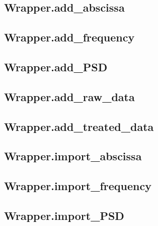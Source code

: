 \subsection{Wrapper.add\_abscissa}\label{subsec:wrapper.add_abscissa}


\subsection{Wrapper.add\_frequency}\label{subsec:wrapper.add_frequency}


\subsection{Wrapper.add\_PSD}\label{subsec:wrapper.add_psd}


\subsection{Wrapper.add\_raw\_data}\label{subsec:wrapper.add_raw_data}


\subsection{Wrapper.add\_treated\_data}\label{subsec:wrapper.add_treated_data}


\subsection{Wrapper.import\_abscissa}\label{subsec:wrapper.import_abscissa}


\subsection{Wrapper.import\_frequency}\label{subsec:wrapper.import_frequency}


\subsection{Wrapper.import\_PSD}\label{subsec:wrapper.import_psd}


